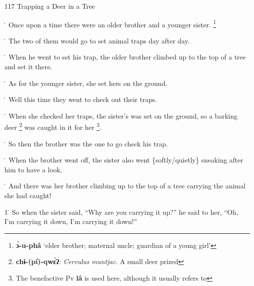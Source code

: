 
117 Trapping a Deer in a Tree

\. Once upon a time there were an older brother and a younger sister. \footnote{\textbf{ɔ̀-u-phâ} `elder brother; maternal uncle; guardian of a young girl'}

\. The two of them would go to set animal traps day after day.

\. When he went to set his trap, the older brother climbed up to the top of a tree
and set it there.

\. As for the younger sister, she set hers on the ground.

\. Well this time they went to check out their traps.

\. When she checked her traps, the sister's was set on the ground, so a barking
deer \footnote{\textbf{chɨ-(pí)-qwɛ̀ʔ}: \textit{Cervulus muntjac}. A small deer prized} was caught in it for her \footnote{The benefactive Pv \textbf{lâ} is used here, although it usually refers to}.

\. So then the brother was the one to go check his trap.

\. When the brother went off, the sister also went \{softly/quietly\} sneaking
after him to have a look.

\. And there was her brother climbing up to the top of a tree carrying the animal
she had caught!

1\. So when the sister said, ``Why are you carrying it up?'' he said to her, ``Oh,
I'm carrying it down, I'm carrying it down!''

